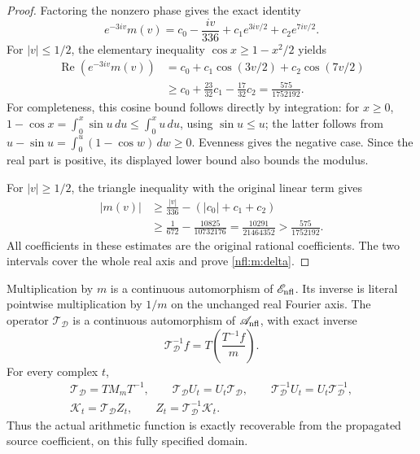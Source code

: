 \begin{proof}
Factoring the nonzero phase gives the exact identity
\[
e^{-3iv}m(v)=c_0-\frac{iv}{336}
                  +c_1e^{3iv/2}+c_2e^{7iv/2}.
\]
For \(|v|\leq1/2\), the elementary inequality
\(\cos x\geq1-x^2/2\) yields
\begin{align*}
\operatorname{Re}(e^{-3iv}m(v))
 &=c_0+c_1\cos(3v/2)+c_2\cos(7v/2)\\
 &\geq c_0+\frac{23}{32}c_1-\frac{17}{32}c_2
 =\frac{575}{1752192}.
\end{align*}
For completeness, this cosine bound follows directly by integration:
for \(x\geq0\),
\(1-\cos x=\int_0^x\sin u\,du\leq\int_0^xu\,du\), using
\(\sin u\leq u\); the latter follows from
\(u-\sin u=\int_0^u(1-\cos w)\,dw\geq0\). Evenness gives the
negative case. Since the real part is positive, its displayed
lower bound also bounds the modulus.

For \(|v|\geq1/2\), the triangle inequality with the original
linear term gives
\begin{align*}
|m(v)|&\geq\frac{|v|}{336}-(|c_0|+c_1+c_2)\\
 &\geq\frac1{672}-\frac{10825}{10732176}
 =\frac{10291}{21464352}
 >\frac{575}{1752192}.
\end{align*}
All coefficients in these estimates are the original rational
coefficients. The two intervals cover the whole real axis and
prove \eqref{nfl:m:delta}.
\end{proof}

\begin{theorem}
\label{nfl:m:automorphism}
Multiplication by \(m\) is a continuous automorphism of \(\mathscr E_{\rm nfl}\).
Its inverse is literal pointwise multiplication by \(1/m\) on
the unchanged real Fourier axis. The operator
\(\mathcal T_{\mathcal D}\) is a continuous automorphism of
\(\mathscr A_{\rm nfl}\), with exact inverse
\begin{equation}
\mathcal T_{\mathcal D}^{-1}f
 =T\left(\frac{T^{-1}f}{m}\right).
\label{nfl:m:inverse}
\end{equation}
For every complex \(t\),
\begin{gather}
\mathcal T_{\mathcal D}=TM_mT^{-1},\qquad
\mathcal T_{\mathcal D}U_t=U_t\mathcal T_{\mathcal D},\qquad
\mathcal T_{\mathcal D}^{-1}U_t
        =U_t\mathcal T_{\mathcal D}^{-1},
\label{nfl:m:commutation}\\
\mathcal K_t=\mathcal T_{\mathcal D}Z_t,
\qquad
Z_t=\mathcal T_{\mathcal D}^{-1}\mathcal K_t.
\label{nfl:m:actual-inverse}
\end{gather}
Thus the actual arithmetic function is exactly recoverable from
the propagated source coefficient, on this fully specified domain.
\end{theorem}

